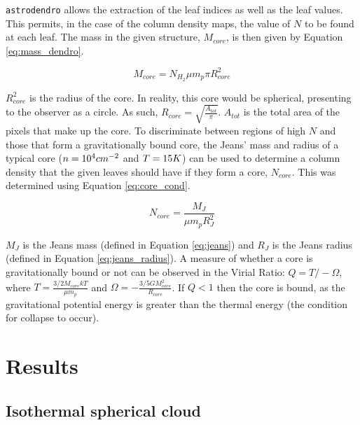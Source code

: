 \documentclass{report}
\begin{document}
\texttt{astrodendro} allows the extraction of the leaf indices as well as the leaf values. This permits, in the case of the column density maps, the value of $N$ to be found at each leaf. The mass in the given structure, $M_{core}$, is then given by Equation \ref{eq:mass_dendro}.

\begin{equation}
  M_{core} = N_{H_{2}}\mu m_{p} \pi R_{core}^{2}
  \label{eq:mass_dendro}
\end{equation}

$R_{core}^{2}$ is the radius of the core. In reality, this core would be spherical, presenting to the observer as a circle. As such, $R_{core} = \sqrt{\frac{A_{tot}}{\pi}}$. $A_{tot}$ is the total area of the pixels that make up the core. To discriminate between regions of high $N$ and those that form a gravitationally bound core, the Jeans' mass and radius of a typical core ($n = 10^{4}\/cm^{-2}$ and $T=15\/K$) can be used to determine a column density that the given leaves should have if they form a core, $N_{core}$. This was determined using Equation \ref{eq:core_cond}.

\begin{equation}
  N_{core} = \frac{M_{J}}{\mu m_{p} R_{J}^{2}}
   \label{eq:core_cond}
\end{equation}

$M_{J}$ is the Jeans mass (defined in Equation \ref{eq:jeans}) and $R_{J}$ is the Jeans radius (defined in Equation \ref{eq:jeans_radius}). A measure of whether a core is gravitationally bound or not can be observed in the Virial Ratio: $Q = T/-\Omega$, where $T=\frac{3/2 M_{core}kT}{\mu m_{p}}$ and $\Omega=-\frac{3/5 GM_{core}^{2}}{R_{core}}$.
If $Q < 1$ then the core is bound, as the gravitational potential energy is greater than the thermal energy (the condition for collapse to occur).


\chapter{Results}

\section{Isothermal spherical cloud} \label{sec:iso}
\end{document}
